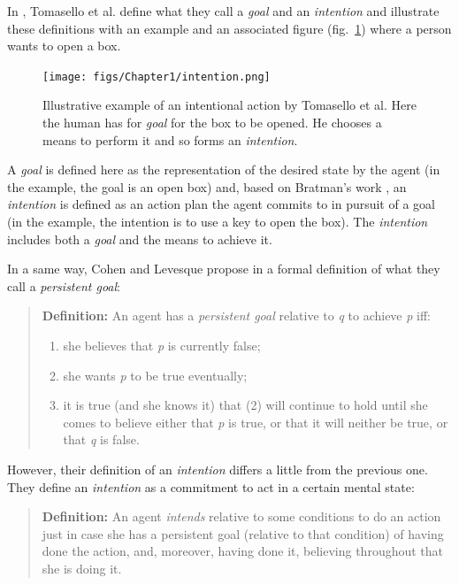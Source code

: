\documentclass[english,a4paper,11pt,twoside]{StyleThese}
\begin{document}
In \cite{tomasello2005understanding}, Tomasello et al. define what they call a \textit{goal} and an \textit{intention} and illustrate these definitions with an example and an associated figure (fig.~\ref{fig:intention}) where a person wants to open a box.

\begin{figure}[!h]
	\centering
    \texttt{[image: figs/Chapter1/intention.png]}
    \caption{Illustrative example of an intentional action by Tomasello et al. Here the human has for \textit{goal} for the box to be opened. He chooses a means to perform it and so forms an \textit{intention}.}
    \label{fig:intention}
\end{figure}
A \textit{goal} is defined here as the representation of the desired state by the agent (in the example, the goal is an open box) and, based on Bratman's work \cite{bratman1989intention}, an \textit{intention} is defined as an action plan the agent commits to in pursuit of a goal (in the example, the intention is to use a key to open the box). The \textit{intention} includes both a \textit{goal} and the means to achieve it.

In a same way, Cohen and Levesque propose in \cite{cohen1991teamwork} a formal definition of what they call a \textit{persistent goal}:

\begin{quote}
\textbf{Definition: } An agent has a \textit{persistent goal} relative to \textit{q} to achieve \textit{p} iff:
\begin{enumerate}
\item she believes that \textit{p} is currently false;
\item she wants \textit{p} to be true eventually;
\item it is true (and she knows it) that (2) will continue to hold until she comes to believe either that \textit{p} is true, or that it will neither be true, or that \textit{q} is false.
\end{enumerate}
\end{quote}

However, their definition of an \textit{intention} differs a little from the previous one. They define an \textit{intention} as a commitment to act in a certain mental state:

\begin{quote}
\textbf{Definition:} An agent \textit{intends} relative to some conditions to do an action just in case she has a persistent goal (relative to that condition) of having done the action, and, moreover, having done it, believing throughout that she is doing it.
\end{quote}
\end{document}
